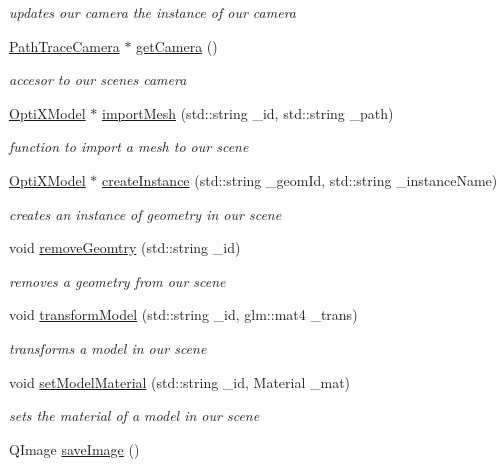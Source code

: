 \begin{DoxyCompactItemize}
\begin{DoxyCompactList}\small\item\em updates our camera the instance of our camera \end{DoxyCompactList}\item 
\hyperlink{class_path_trace_camera}{Path\-Trace\-Camera} $\ast$ \hyperlink{class_path_tracer_scene_ac60793bd6cb9c0b45efbe0db1231e596}{get\-Camera} ()
\begin{DoxyCompactList}\small\item\em accesor to our scenes camera \end{DoxyCompactList}\item 
\hyperlink{class_opti_x_model}{Opti\-X\-Model} $\ast$ \hyperlink{class_path_tracer_scene_ab41f55350a5a50b60381cd46120c45aa}{import\-Mesh} (std\-::string \-\_\-id, std\-::string \-\_\-path)
\begin{DoxyCompactList}\small\item\em function to import a mesh to our scene \end{DoxyCompactList}\item 
\hyperlink{class_opti_x_model}{Opti\-X\-Model} $\ast$ \hyperlink{class_path_tracer_scene_a3980f3179a2f1d1a97ea5698f76eb317}{create\-Instance} (std\-::string \-\_\-geom\-Id, std\-::string \-\_\-instance\-Name)
\begin{DoxyCompactList}\small\item\em creates an instance of geometry in our scene \end{DoxyCompactList}\item 
void \hyperlink{class_path_tracer_scene_ac65c3f2b50b67511416cc80ca9abc179}{remove\-Geomtry} (std\-::string \-\_\-id)
\begin{DoxyCompactList}\small\item\em removes a geometry from our scene \end{DoxyCompactList}\item 
void \hyperlink{class_path_tracer_scene_adeddc6d4c2df9c23baebb32ee016c57b}{transform\-Model} (std\-::string \-\_\-id, glm\-::mat4 \-\_\-trans)
\begin{DoxyCompactList}\small\item\em transforms a model in our scene \end{DoxyCompactList}\item 
void \hyperlink{class_path_tracer_scene_a2930f6745167861525ce431487daa40f}{set\-Model\-Material} (std\-::string \-\_\-id, Material \-\_\-mat)
\begin{DoxyCompactList}\small\item\em sets the material of a model in our scene \end{DoxyCompactList}\item 
\hypertarget{class_path_tracer_scene_a6bffe49d297fed54fad3e5461f870f2d}{Q\-Image \hyperlink{class_path_tracer_scene_a6bffe49d297fed54fad3e5461f870f2d}{save\-Image} ()}\label{class_path_tracer_scene_a6bffe49d297fed54fad3e5461f870f2d}


\end{DoxyCompactItemize}
